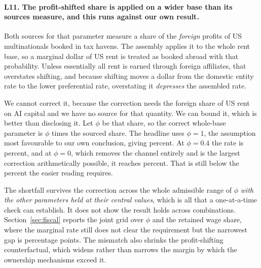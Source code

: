 \paragraph{L11. The profit-shifted share is applied on a wider base than its sources measure,
and this runs against our own result.} Both sources for that parameter measure a share of the
\emph{foreign} profits of US multinationals booked in tax havens. The assembly applies it to the
whole rent base, so a marginal dollar of US rent is treated as booked abroad with that
probability. Unless essentially all rent is earned through foreign affiliates, that overstates
shifting, and because shifting moves a dollar from the domestic entity rate to the lower
preferential rate, overstating it \emph{depresses} the assembled rate.

We cannot correct it, because the correction needs the foreign share of US rent on AI capital and
we have no source for that quantity. We can bound it, which is better than disclosing it. Let
$\phi$ be that share, so the correct whole-base parameter is $\phi$ times the sourced share. The
headline uses $\phi = 1$, the assumption most favourable to our own conclusion, giving
 percent. At $\phi = 0.4$ the rate is  percent, and at
$\phi = 0$, which removes the channel entirely and is the largest correction arithmetically
possible, it reaches  percent. That is still below the
 percent the easier reading requires.

The shortfall survives the correction across the whole admissible range of $\phi$ \emph{with the
other parameters held at their central values}, which is all that a one-at-a-time check can
establish. It does not show the result holds across combinations. Section~\ref{sec:fiscal} reports the joint
grid over $\phi$ and the retained wage share, where the marginal rate still does not clear the
requirement but the narrowest gap is  percentage points. The mismatch also shrinks the
profit-shifting counterfactual, which widens rather than narrows the margin by which the
ownership mechanisms exceed it.
